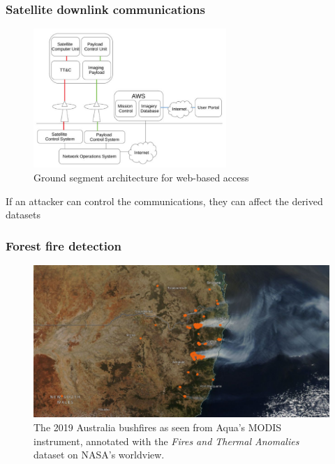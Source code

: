 \documentclass{beamer}
\begin{document}
\begin{frame}
  \frametitle{Satellite downlink communications}
  \begin{figure}
      \includegraphics[width=0.65\textwidth]{images/dataset_generation.png}
      \caption{Ground segment architecture for web-based access}
      \label{fig:space_segment}
  \end{figure}

  If an attacker can control the communications, they can affect the derived datasets
\end{frame}

\begin{frame}
  \frametitle{Forest fire detection}
  \begin{figure}
      \centering
      \includegraphics[width=\columnwidth]{images/bushfire.png}
      \caption{The 2019 Australia bushfires as seen from Aqua's MODIS instrument, annotated with the \textit{Fires and Thermal Anomalies} dataset on NASA's worldview.\protect\footnotemark}
      \label{fig:bushfire}
  \end{figure}
\end{frame}
\end{document}
